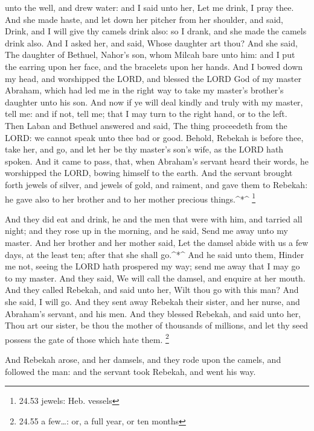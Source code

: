 unto the well, and drew water: and I said unto her, Let me drink, I pray
thee.  And she made haste, and let down her pitcher from
her shoulder, and said, Drink, and I will give thy camels drink also: so
I drank, and she made the camels drink also.  And I asked
her, and said, Whose daughter art thou? And she said, The daughter of
Bethuel, Nahor's son, whom Milcah bare unto him: and I put the earring
upon her face, and the bracelets upon her hands.  And I
bowed down my head, and worshipped the LORD, and blessed the LORD God of
my master Abraham, which had led me in the right way to take my master's
brother's daughter unto his son.  And now if ye will deal
kindly and truly with my master, tell me: and if not, tell me; that I
may turn to the right hand, or to the left.  Then Laban and
Bethuel answered and said, The thing proceedeth from the LORD: we cannot
speak unto thee bad or good.  Behold, Rebekah is before
thee, take her, and go, and let her be thy master's son's wife, as the
LORD hath spoken.  And it came to pass, that, when
Abraham's servant heard their words, he worshipped the LORD, bowing
himself to the earth.  And the servant brought forth jewels
of silver, and jewels of gold, and raiment, and gave them to Rebekah: he
gave also to her brother and to her mother precious things.\^{}*\^{}
\footnote{24.53 jewels: Heb. vessels}

 And they did eat and drink, he and the men that were with
him, and tarried all night; and they rose up in the morning, and he
said, Send me away unto my master.  And her brother and her
mother said, Let the damsel abide with us a few days, at the least ten;
after that she shall go.\^{}*\^{}  And he said unto them,
Hinder me not, seeing the LORD hath prospered my way; send me away that
I may go to my master.  And they said, We will call the
damsel, and enquire at her mouth.  And they called Rebekah,
and said unto her, Wilt thou go with this man? And she said, I will go.
 And they sent away Rebekah their sister, and her nurse,
and Abraham's servant, and his men.  And they blessed
Rebekah, and said unto her, Thou art our sister, be thou the mother of
thousands of millions, and let thy seed possess the gate of those which
hate them. \footnote{24.55 a few\ldots: or, a full year, or ten months}

 And Rebekah arose, and her damsels, and they rode upon the
camels, and followed the man: and the servant took Rebekah, and went his
way.

